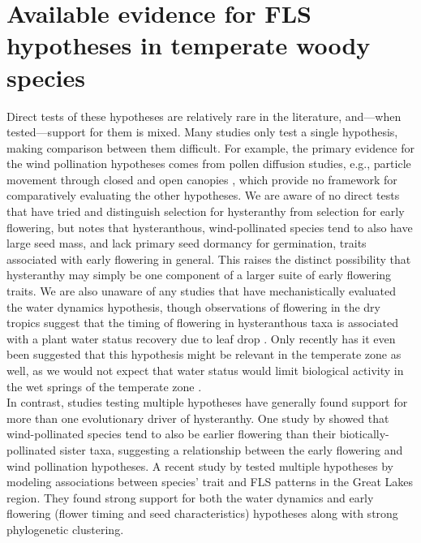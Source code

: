 \documentclass[12pt]{article}
\begin{document}
\section*{Available evidence for FLS hypotheses in temperate woody species} 
\indent\indent Direct tests of these hypotheses are relatively rare in the literature, and---when tested---support for them is mixed. Many studies only test a single hypothesis, making comparison between them difficult. For example, the primary evidence for the wind pollination hypotheses comes from pollen diffusion studies, e.g., particle movement through closed and open canopies \citep{Niklas1985,Nathan2005, Milleron2012}, which provide no framework for comparatively evaluating the other hypotheses. We are aware of no direct tests that have tried and distinguish selection for hysteranthy from selection for early flowering, but \citet{Primack1987} notes that hysteranthous, wind-pollinated species tend to also have large seed mass, and lack primary seed dormancy for germination, traits associated with early flowering in general. This raises the distinct possibility that hysteranthy may simply be one component of a larger suite of early flowering traits. We are also unaware of any studies that have mechanistically evaluated the water dynamics hypothesis, though observations of flowering in the dry tropics suggest that the timing of flowering in hysteranthous taxa is associated with a plant water status recovery due to leaf drop \citep{Borchert1983,Reich1984}. Only recently has it even been suggested that this hypothesis might be relevant in the temperate zone as well, as we would not expect that water status would limit biological activity in the wet springs of the temperate zone \citep{Gougherty2018}.\\

\indent In contrast, studies testing multiple hypotheses have generally found support for more than one evolutionary driver of hysteranthy. One study by \citet{Bolmgren2003} showed that wind-pollinated species tend to also be earlier flowering than their biotically-pollinated sister taxa, suggesting a relationship between the early flowering and wind pollination hypotheses. A recent study by \citet{Gougherty2018} tested multiple hypotheses by modeling associations between species' trait and FLS patterns in the Great Lakes region. They found strong support for both the water dynamics and early flowering (flower timing and seed characteristics) hypotheses along with strong phylogenetic clustering. \\
\end{document}
